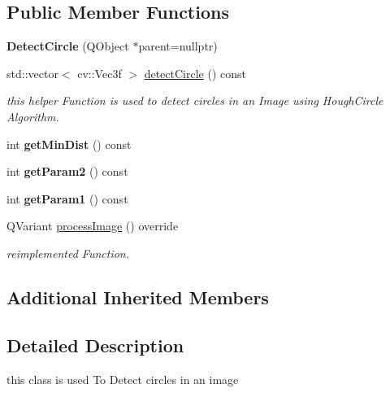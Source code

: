 \subsection*{Public Member Functions}
\begin{DoxyCompactItemize}
\item 
\mbox{\label{class_image_processor_1_1_detect_circle_addc37fab154547b0b3b7b7e78bf71d04}} 
{\bfseries Detect\+Circle} (Q\+Object $\ast$parent=nullptr)
\item 
std\+::vector$<$ cv\+::\+Vec3f $>$ \hyperlink{class_image_processor_1_1_detect_circle_a6324c8bfcc4e8df8d584a037250b22b2}{detect\+Circle} () const
\begin{DoxyCompactList}\small\item\em this helper Function is used to detect circles in an Image using Hough\+Circle Algorithm. \end{DoxyCompactList}\item 
\mbox{\label{class_image_processor_1_1_detect_circle_a9e83f089602650f7afcb97172a23f329}} 
int {\bfseries get\+Min\+Dist} () const
\item 
\mbox{\label{class_image_processor_1_1_detect_circle_a8a54460ead0a0204e6321215851d9234}} 
int {\bfseries get\+Param2} () const
\item 
\mbox{\label{class_image_processor_1_1_detect_circle_a4f7719cf36a987db2eb64dc5d8cf0779}} 
int {\bfseries get\+Param1} () const
\item 
Q\+Variant \hyperlink{class_image_processor_1_1_detect_circle_ae0c7b4759827b218a03b16567233b4d5}{process\+Image} () override
\begin{DoxyCompactList}\small\item\em reimplemented Function. \end{DoxyCompactList}\end{DoxyCompactItemize}
\subsection*{Additional Inherited Members}


\subsection{Detailed Description}
this class is used To Detect circles in an image 

